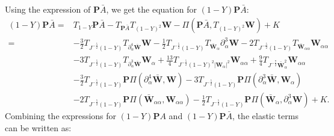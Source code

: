\documentclass[10pt]{amsart}
\theoremstyle{remark}
\theoremstyle{definition}
\numberwithin{equation}{section}
\newcommand{\p}{\partial}
\newcommand{\al}{\alpha}
\newcommand{\f}{\frac}
\newcommand{\bw}{\mathbf{W}}
\newcommand{\nP}{{\mathbf P}}
\begin{document}
Using the expression of $\nP \bar{A}$, we get the equation for $(1-Y)\nP \bar{A}$:
\begin{align*}
(1-Y)\nP \bar{A}
=&T_{1-Y}\nP \bar{A}-T_{\nP \bar{A}}T_{(1-Y)^2}\bw-\Pi(\nP \bar{A},T_{(1-Y)^2}\bw)+K \\
=& - \f32 T_{J^{-\f52}(1-Y)}T_{\p^4_{\al}\bar{\bw}} \bw 
-\f12 T_{J^{-\f52}(1-Y)}T_{\bar{\bw}_{\al}} \p^3_{\al}\bw 
-2 T_{J^{-\f52}(1-Y)}T_{\bar{\bw}_{\al \al}}\bw_{\al \al} \\
&-3 T_{J^{-\f52}(1-Y)}T_{\p^3_{\al}\bar{\bw}}\bw_{\al}+\f{13}{4}T_{J^{-\f52}(1-Y)^2|\bw_{\al}|^2}\bw_{\al\al}+\f94 T_{J^{-\f72}\bar{\bw}^2_{\al}}\bw_{\al\al} \\
&-\f32 T_{J^{-\f52}(1-Y)}\nP\Pi(\p^4_{\al}\bar{\bw}, \bw)- 3T_{J^{-\f52}(1-Y)}\nP\Pi(\p^3_{\al}\bar{\bw}, \bw_{\al}) \\
&-2 T_{J^{-\f52}(1-Y)} \nP \Pi(\bar{\bw}_{\al \al}, \bw_{\al \al}) -\f12 T_{J^{-\f52}(1-Y)}\nP \Pi(\bar{\bw}_{\al},
\p^3_{\al}\bw) + K.
\end{align*}
Combining the expressions for $(1-Y)\nP A$ and $(1-Y)\nP\bar{A}$, the elastic terms can be written as:
\end{document}
